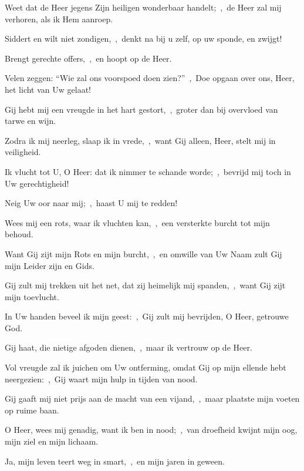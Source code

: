\documentclass[12pt,twoside,a5paper]{article}
\begin{document}
\begin{halfparskip}
  Weet dat de Heer jegens Zijn heiligen wonderbaar handelt;~\sep\ de Heer zal mij verhoren, als ik Hem aanroep.

  Siddert en wilt niet zondigen,~\sep\ denkt na bij u zelf, op uw sponde, en zwijgt!

  Brengt gerechte offers,~\sep\ en hoopt op de Heer.

  Velen zeggen: ``Wie zal ons voorspoed doen zien?''~\sep\ Doe opgaan over ons, Heer, het licht van Uw gelaat!

  Gij hebt mij een vreugde in het hart gestort,~\sep\ groter dan bij overvloed van tarwe en wijn.

  Zodra ik mij neerleg, slaap ik in vrede,~\sep\ want Gij alleen, Heer, stelt mij in veiligheid.
\end{halfparskip}

\begin{halfparskip}

   Ik vlucht tot U, O Heer: dat ik nimmer te schande worde;~\sep\ bevrijd mij toch in Uw gerechtigheid!


  Neig Uw oor naar mij;~\sep\ haast U mij te redden!

  Wees mij een rots, waar ik vluchten kan,~\sep\ een versterkte burcht tot mijn behoud.

  Want Gij zijt mijn Rots en mijn burcht,~\sep\ en omwille van Uw Naam zult Gij mijn Leider zijn en Gids.

  Gij zult mij trekken uit het net, dat zij heimelijk mij spanden,~\sep\ want Gij zijt mijn toevlucht.

  In Uw handen beveel ik mijn geest:~\sep\ Gij zult mij bevrijden, O Heer, getrouwe God.

  Gij haat, die nietige afgoden dienen,~\sep\ maar ik vertrouw op de Heer.

  Vol vreugde zal ik juichen om Uw ontferming, omdat Gij op mijn ellende hebt neergezien:~\sep\ Gij waart mijn hulp in tijden van nood.

  Gij gaaft mij niet prijs aan de macht van een vijand,~\sep\ maar plaatste mijn voeten op ruime baan.

  O Heer, wees mij genadig, want ik ben in nood;~\sep\ van droefheid kwijnt mijn oog, mijn ziel en mijn lichaam.

  Ja, mijn leven teert weg in smart,~\sep\ en mijn jaren in geween.


\end{halfparskip}
\end{document}
